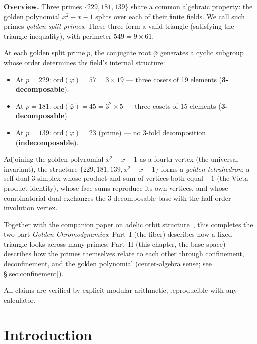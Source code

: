 


\vspace{1em}\noindent\textbf{Overview.}
Three primes $\{229, 181, 139\}$ share a common algebraic property:
the golden polynomial $x^2 - x - 1$ splits over each of their finite
fields. We call such primes \emph{golden split primes}. These three
form a valid triangle (satisfying the triangle inequality), with
perimeter $549 = 9 \times 61$.

At each golden split prime $p$, the conjugate root
$\bar\varphi$ generates a cyclic subgroup whose order determines
the field's internal structure:
\begin{itemize}
  \item At $p = 229$: $\mathrm{ord}(\bar\varphi) = 57 = 3 \times 19$
    --- three cosets of 19 elements (\textbf{3-decomposable}).
  \item At $p = 181$: $\mathrm{ord}(\bar\varphi) = 45 = 3^2 \times 5$
    --- three cosets of 15 elements (\textbf{3-decomposable}).
  \item At $p = 139$: $\mathrm{ord}(\bar\varphi) = 23$ (prime)
    --- no 3-fold decomposition (\textbf{indecomposable}).
\end{itemize}

Adjoining the golden polynomial $x^2 - x - 1$ as a fourth vertex
(the universal invariant), the structure $\{229, 181, 139, x^2{-}x{-}1\}$
forms a \emph{golden tetrahedron}: a self-dual 3-simplex whose
product and sum of vertices both equal $-1$ (the Vieta product
identity), whose face sums reproduce its own vertices, and whose
combinatorial dual exchanges the 3-decomposable base with the
half-order involution vertex.

Together with the companion paper on adelic orbit
structure~\cite{dwm_fst}, this completes the two-part
\emph{Golden Chromodynamics}: Part~I (the fiber) describes how a
fixed triangle looks across many primes; Part~II (this chapter,
the base space) describes how the primes themselves relate
to each other through confinement, deconfinement, and the
golden polynomial (center-algebra sense; see \S\ref{sec:confinement}).

All claims are verified by explicit modular arithmetic, reproducible
with any calculator.
\vspace{1em}


\newpage


\section{Introduction}
\label{sec:intro}

